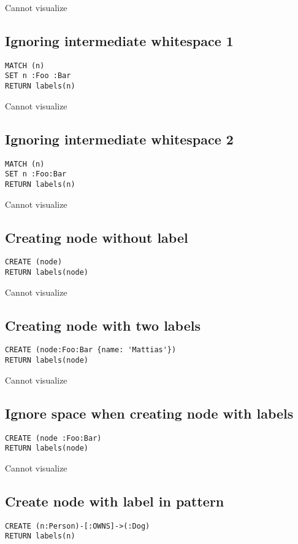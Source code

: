 Cannot visualize
\subsection{Ignoring intermediate whitespace 1}

\begin{lstlisting}
MATCH (n)
SET n :Foo :Bar
RETURN labels(n)
\end{lstlisting}

Cannot visualize
\subsection{Ignoring intermediate whitespace 2}

\begin{lstlisting}
MATCH (n)
SET n :Foo:Bar
RETURN labels(n)
\end{lstlisting}

Cannot visualize
\subsection{Creating node without label}

\begin{lstlisting}
CREATE (node)
RETURN labels(node)
\end{lstlisting}

Cannot visualize
\subsection{Creating node with two labels}

\begin{lstlisting}
CREATE (node:Foo:Bar {name: 'Mattias'})
RETURN labels(node)
\end{lstlisting}

Cannot visualize
\subsection{Ignore space when creating node with labels}

\begin{lstlisting}
CREATE (node :Foo:Bar)
RETURN labels(node)
\end{lstlisting}

Cannot visualize
\subsection{Create node with label in pattern}

\begin{lstlisting}
CREATE (n:Person)-[:OWNS]->(:Dog)
RETURN labels(n)
\end{lstlisting}

